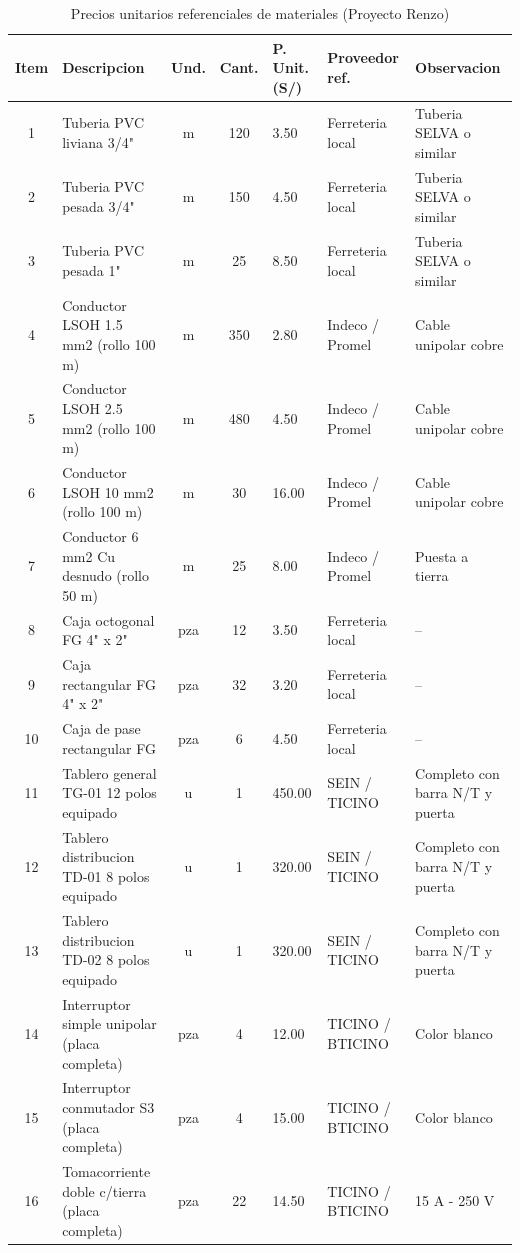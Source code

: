 \begin{table}[H]
\centering
\footnotesize
\caption{Precios unitarios referenciales de materiales (Proyecto Renzo)}
\label{tab:precios-unitarios}
\begin{tabularx}{\textwidth}{c Y c c R{1.8cm} L{2.0cm} L{2.5cm}}
\toprule
\textbf{Item} & \textbf{Descripcion} & \textbf{Und.} & \textbf{Cant.} & \textbf{P. Unit. (S/)} & \textbf{Proveedor ref.} & \textbf{Observacion} \\
 & Tuberia PVC liviana 3/4" & m & 120 & 3.50 & Ferreteria local & Tuberia SELVA o similar \\
2 & Tuberia PVC pesada 3/4" & m & 150 & 4.50 & Ferreteria local & Tuberia SELVA o similar \\
3 & Tuberia PVC pesada 1" & m & 25 & 8.50 & Ferreteria local & Tuberia SELVA o similar \\
4 & Conductor LSOH 1.5 mm2 (rollo 100 m) & m & 350 & 2.80 & Indeco / Promel & Cable unipolar cobre \\
5 & Conductor LSOH 2.5 mm2 (rollo 100 m) & m & 480 & 4.50 & Indeco / Promel & Cable unipolar cobre \\
6 & Conductor LSOH 10 mm2 (rollo 100 m) & m & 30 & 16.00 & Indeco / Promel & Cable unipolar cobre \\
7 & Conductor 6 mm2 Cu desnudo (rollo 50 m) & m & 25 & 8.00 & Indeco / Promel & Puesta a tierra \\
8 & Caja octogonal FG 4" x 2" & pza & 12 & 3.50 & Ferreteria local & -- \\
9 & Caja rectangular FG 4" x 2" & pza & 32 & 3.20 & Ferreteria local & -- \\
10 & Caja de pase rectangular FG & pza & 6 & 4.50 & Ferreteria local & -- \\
11 & Tablero general TG-01 12 polos equipado & u & 1 & 450.00 & SEIN / TICINO & Completo con barra N/T y puerta \\
12 & Tablero distribucion TD-01 8 polos equipado & u & 1 & 320.00 & SEIN / TICINO & Completo con barra N/T y puerta \\
13 & Tablero distribucion TD-02 8 polos equipado & u & 1 & 320.00 & SEIN / TICINO & Completo con barra N/T y puerta \\
14 & Interruptor simple unipolar (placa completa) & pza & 4 & 12.00 & TICINO / BTICINO & Color blanco \\
15 & Interruptor conmutador S3 (placa completa) & pza & 4 & 15.00 & TICINO / BTICINO & Color blanco \\
16 & Tomacorriente doble c/tierra (placa completa) & pza & 22 & 14.50 & TICINO / BTICINO & 15 A - 250 V \\

\end{tabularx}
\end{table}
